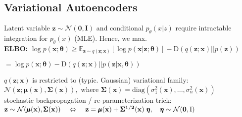 \subsection*{Variational Autoencoders}

Latent variable $\mathbf z\sim\mathcal N(\mathbf 0, \mathbf I)$ and conditional $p_\theta(x|z)$ require intractable integration for $p_\theta(x)$ (MLE). Hence, we max.\\
\textbf{ELBO:} $\log p(\mathbf x;\pmb\theta)\geq \mathbb E_{\mathbf z\sim q(\mathbf z;\mathbf x)}[\log p(\mathbf x|\mathbf z;\pmb\theta)]-\text{D}(q(\mathbf z;\mathbf x)||p(\mathbf z))$

\hfill $= \log p(\mathbf x;\pmb\theta) - \text{D}(q(\mathbf z;\mathbf x)||p(\mathbf z | \mathbf x, \pmb \theta))$


$q(\mathbf z;\mathbf x)$ is restricted to (typic. Gaussian) variational family: \\ $\mathcal N(\mathbf z;\pmb\mu(\mathbf x),\pmb\Sigma(\mathbf x)), \text{ where } \pmb\Sigma(\mathbf x)=\text{diag}(\sigma_1^2(\mathbf x),...,\sigma_n^2(\mathbf x))$\\
stochastic backpropagation / re-parameterization trick:\\
$\mathbf z\sim\mathcal N(\pmb\mu(\bf x),\pmb\Sigma(\bf x)) \quad \Leftrightarrow \quad\mathbf z=\pmb\mu(\bf x)+\pmb\Sigma^{1/2} \bf(x)\ \pmb\eta, \quad \pmb\eta\sim\mathcal N(\mathbf 0,\mathrm I)$
